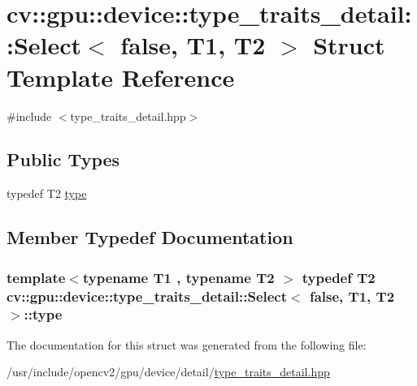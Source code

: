 \hypertarget{structcv_1_1gpu_1_1device_1_1type__traits__detail_1_1Select_3_01false_00_01T1_00_01T2_01_4}{\section{cv\-:\-:gpu\-:\-:device\-:\-:type\-\_\-traits\-\_\-detail\-:\-:Select$<$ false, T1, T2 $>$ Struct Template Reference}
\label{structcv_1_1gpu_1_1device_1_1type__traits__detail_1_1Select_3_01false_00_01T1_00_01T2_01_4}
}


{\ttfamily \#include $<$type\-\_\-traits\-\_\-detail.\-hpp$>$}

\subsection*{Public Types}
\begin{DoxyCompactItemize}
\item 
typedef T2 \hyperlink{structcv_1_1gpu_1_1device_1_1type__traits__detail_1_1Select_3_01false_00_01T1_00_01T2_01_4_ac69af49dcd8e40b674cfb8be86f52c3d}{type}
\end{DoxyCompactItemize}


\subsection{Member Typedef Documentation}
\hypertarget{structcv_1_1gpu_1_1device_1_1type__traits__detail_1_1Select_3_01false_00_01T1_00_01T2_01_4_ac69af49dcd8e40b674cfb8be86f52c3d}{
\subsubsection[{type}]{\setlength{\rightskip}{0pt plus 5cm}template$<$typename T1 , typename T2 $>$ typedef T2 {\bf cv\-::gpu\-::device\-::type\-\_\-traits\-\_\-detail\-::\-Select}$<$ {\bf false}, T1, T2 $>$\-::{\bf type}}}\label{structcv_1_1gpu_1_1device_1_1type__traits__detail_1_1Select_3_01false_00_01T1_00_01T2_01_4_ac69af49dcd8e40b674cfb8be86f52c3d}


The documentation for this struct was generated from the following file\-:\begin{DoxyCompactItemize}
\item 
/usr/include/opencv2/gpu/device/detail/\hyperlink{type__traits__detail_8hpp}{type\-\_\-traits\-\_\-detail.\-hpp}\end{DoxyCompactItemize}
